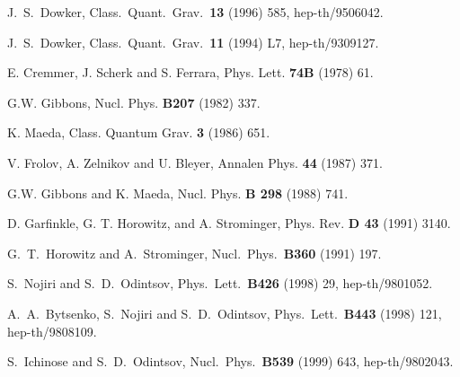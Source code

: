 \documentclass[a4paper,12pt]{article}
\begin{document}
\begin{thebibliography}{99}
J.~S.~Dowker,
Class.\ Quant.\ Grav.\  {\bf 13} (1996) 585, hep-th/9506042. 

J.~S.~Dowker,
Class.\ Quant.\ Grav.\  {\bf 11} (1994) L7, hep-th/9309127.  

E. Cremmer, J. Scherk and S. Ferrara, Phys. Lett. {\bf 74B} (1978) 61.

G.W. Gibbons, Nucl. Phys. {\bf B207} (1982) 337.

K. Maeda, Class. Quantum Grav. {\bf 3} (1986) 651.

V. Frolov, A. Zelnikov and U. Bleyer, Annalen Phys. {\bf 44}
(1987) 371.

G.W. Gibbons and K. Maeda, Nucl. Phys. {\bf B 298} (1988) 741.

D. Garfinkle, G. T. Horowitz, and A. Strominger,
Phys. Rev. {\bf D 43} (1991) 3140.

G.~T.~Horowitz and A.~Strominger,
Nucl.\ Phys.\  {\bf B360} (1991) 197.

S.~Nojiri and S.~D.~Odintsov,
Phys.\ Lett.\  {\bf B426} (1998) 29, hep-th/9801052.

A.~A.~Bytsenko, S.~Nojiri and S.~D.~Odintsov,
Phys.\ Lett.\  {\bf B443} (1998) 121, hep-th/9808109.  

S.~Ichinose and S.~D.~Odintsov,
Nucl.\ Phys.\  {\bf B539} (1999) 643, hep-th/9802043.

\end{thebibliography}
\end{document}
